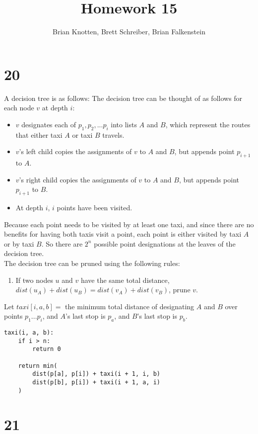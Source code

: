 \documentclass[letterpaper,notitlepage,twoside]{article}
\begin{document}
\title{Homework 15}
\author{Brian Knotten, Brett Schreiber, Brian Falkenstein}
\maketitle

\section*{20}
A decision tree is as follows:
The decision tree can be thought of as follows for each node $v$ at depth $i$:
\begin{itemize}
  \item $v$ designates each of $p_1,p_2,...p_i$ into lists $A$ and $B$, which represent the routes that either taxi $A$ or taxi $B$ travels.
  \item $v$'s left child copies the assignments of $v$ to $A$ and $B$, but appends point $p_{i + 1}$ to $A$.
  \item $v$'s right child copies the assignments of $v$ to $A$ and $B$, but appends point $p_{i + 1}$ to $B$.
  \item At depth $i$, $i$ points have been visited.
\end{itemize}
Because each point needs to be visited by at least one taxi, and since there are no benefits for having both taxis visit a point, each point is either visited by taxi $A$ or by taxi $B$. So there are $2^n$ possible point designations at the leaves of the decision tree. \\
The decision tree can be pruned using the following rules:
\begin{enumerate}
  \item If two nodes $u$ and $v$ have the same total distance, $dist(u_A) + dist(u_B) = dist(v_A) + dist(v_B)$, prune $v$.
  
\end{enumerate}

Let $taxi[i, a, b] =$ the minimum total distance of designating $A$ and $B$ over points $p_1...p_i$, and $A$'s last stop is $p_a$, and $B$'s last stop is $p_b$.

\begin{verbatim}
taxi(i, a, b):
    if i > n:
        return 0
    
    return min(
        dist(p[a], p[i]) + taxi(i + 1, i, b)
        dist(p[b], p[i]) + taxi(i + 1, a, i)
    )
\end{verbatim}

\section*{21}
\end{document}

